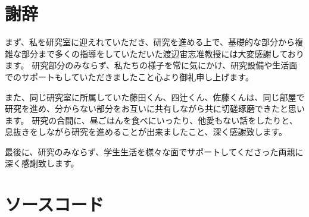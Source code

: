 \documentclass[titlepage]{jsreport}
\begin{document}
\chapter*{謝辞}

まず、私を研究室に迎えれていただき、研究を進める上で、基礎的な部分から複雑な部分まで多くの指導をしていただいた渡辺宙志准教授には大変感謝しております。
研究部分のみならず、私たちの様子を常に気にかけ、研究設備や生活面でのサポートもしていただきましたこと心より御礼申し上げます。

また、同じ研究室に所属していた藤田くん、四辻くん、佐藤くんは、同じ部屋で研究を進め、分からない部分をお互いに共有しながら共に切磋琢磨できたと思います。
研究の合間に、昼ごはんを食べにいったり、他愛もない話をしたりと、息抜きをしながら研究を進めることが出来ましたこと、深く感謝致します。

最後に、研究のみならず、学生生活を様々な面でサポートしてくださった両親に深く感謝致します。


\appendix

\chapter{ソースコード}





\end{document}
